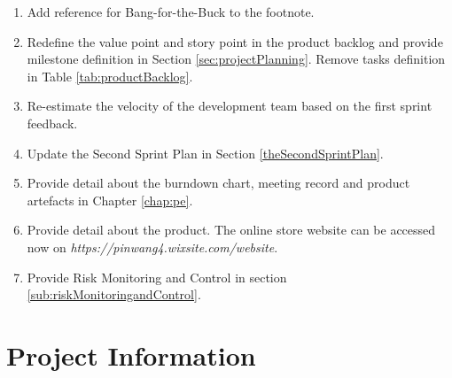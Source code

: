 \documentclass{report}
\begin{document}
\begin{enumerate}
    \item Add reference for Bang-for-the-Buck to the footnote.
    \item Redefine the value point and story point in the product backlog and provide milestone definition in Section \ref{sec:projectPlanning}. Remove tasks definition in Table \ref{tab:productBacklog}.  
    \item Re-estimate the velocity of the development team based on the first sprint feedback.
    \item Update the Second Sprint Plan in Section \ref{theSecondSprintPlan}.
    \item Provide detail about the burndown chart, meeting record and product artefacts in Chapter \ref{chap:pe}.
    \item Provide detail about the product. The online store website can be accessed now on \textit{https://pinwang4.wixsite.com/website}.
    \item Provide Risk Monitoring and Control in section \ref{sub:riskMonitoringandControl}.
  \end{enumerate}

\chapter{Project Information}
\label{projectInformation}
\end{document}
